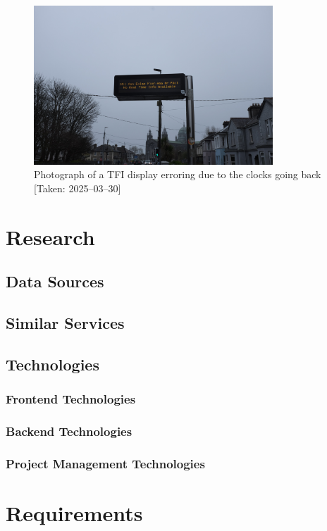 \documentclass[a4paper,11pt]{report}
\begin{document}
\begin{figure}[H]
    \centering
    \includegraphics[width=0.8\textwidth]{./images/DSCF3477.JPG}
    \caption{Photograph of a TFI display erroring due to the clocks going back [Taken: 2025--03--30]}
\end{figure}

\chapter{Research}
\section{Data Sources}
\section{Similar Services}

\section{Technologies}
\subsection{Frontend Technologies}
\subsection{Backend Technologies}
\subsection{Project Management Technologies}

\chapter{Requirements}
\end{document}
